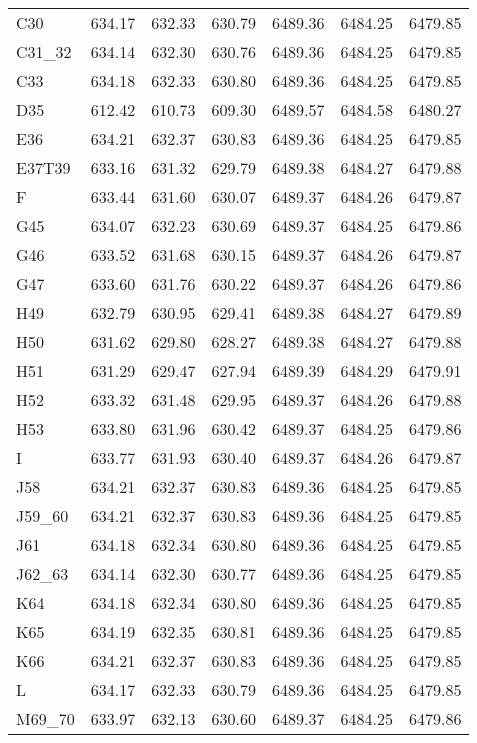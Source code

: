 \begin{tabular}{lllllll}
C30 & 634.17 & 632.33 & 630.79 & 6489.36 & 6484.25 & 6479.85 \\
C31\_32 & 634.14 & 632.30 & 630.76 & 6489.36 & 6484.25 & 6479.85 \\
C33 & 634.18 & 632.33 & 630.80 & 6489.36 & 6484.25 & 6479.85 \\
D35 & 612.42 & 610.73 & 609.30 & 6489.57 & 6484.58 & 6480.27 \\
E36 & 634.21 & 632.37 & 630.83 & 6489.36 & 6484.25 & 6479.85 \\
E37T39 & 633.16 & 631.32 & 629.79 & 6489.38 & 6484.27 & 6479.88 \\
F & 633.44 & 631.60 & 630.07 & 6489.37 & 6484.26 & 6479.87 \\
G45 & 634.07 & 632.23 & 630.69 & 6489.37 & 6484.25 & 6479.86 \\
G46 & 633.52 & 631.68 & 630.15 & 6489.37 & 6484.26 & 6479.87 \\
G47 & 633.60 & 631.76 & 630.22 & 6489.37 & 6484.26 & 6479.86 \\
H49 & 632.79 & 630.95 & 629.41 & 6489.38 & 6484.27 & 6479.89 \\
H50 & 631.62 & 629.80 & 628.27 & 6489.38 & 6484.27 & 6479.88 \\
H51 & 631.29 & 629.47 & 627.94 & 6489.39 & 6484.29 & 6479.91 \\
H52 & 633.32 & 631.48 & 629.95 & 6489.37 & 6484.26 & 6479.88 \\
H53 & 633.80 & 631.96 & 630.42 & 6489.37 & 6484.25 & 6479.86 \\
I & 633.77 & 631.93 & 630.40 & 6489.37 & 6484.26 & 6479.87 \\
J58 & 634.21 & 632.37 & 630.83 & 6489.36 & 6484.25 & 6479.85 \\
J59\_60 & 634.21 & 632.37 & 630.83 & 6489.36 & 6484.25 & 6479.85 \\
J61 & 634.18 & 632.34 & 630.80 & 6489.36 & 6484.25 & 6479.85 \\
J62\_63 & 634.14 & 632.30 & 630.77 & 6489.36 & 6484.25 & 6479.85 \\
K64 & 634.18 & 632.34 & 630.80 & 6489.36 & 6484.25 & 6479.85 \\
K65 & 634.19 & 632.35 & 630.81 & 6489.36 & 6484.25 & 6479.85 \\
K66 & 634.21 & 632.37 & 630.83 & 6489.36 & 6484.25 & 6479.85 \\
L & 634.17 & 632.33 & 630.79 & 6489.36 & 6484.25 & 6479.85 \\
M69\_70 & 633.97 & 632.13 & 630.60 & 6489.37 & 6484.25 & 6479.86 \\

\end{tabular}
